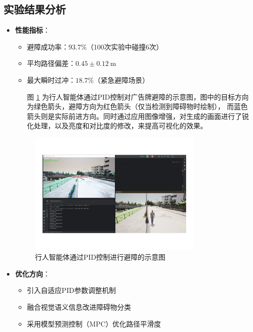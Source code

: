 \subsection{实验结果分析}
\begin{itemize}
    \item \textbf{性能指标}：
    \begin{itemize}
        \item 避障成功率：93.7\%（100次实验中碰撞6次）
        \item 平均路径偏差：$0.45\pm0.12\ \text{m}$
        \item 最大瞬时过冲：$18.7\%$（紧急避障场景）

	图 \ref{fig:pid_obstacle} 为行人智能体通过PID控制对广告牌避障的示意图，图中的目标方向为绿色箭头，避障方向为红色箭头（仅当检测到障碍物时绘制），	而蓝色箭头则是实际前进方向。同时通过应用图像增强，对生成的画面进行了锐化处理，以及亮度和对比度的修改，来提高可视化的效果。

    \end{itemize}

\begin{figure}[H]
    \centering
    \includegraphics[width=0.8\textwidth]{images/obstacle_avoidance.pdf}
    \caption{行人智能体通过PID控制进行避障的示意图}
    \label{fig:pid_obstacle}
\end{figure}
    
    \item \textbf{优化方向}：
    \begin{itemize}
        \item 引入自适应PID参数调整机制
        \item 融合视觉语义信息改进障碍物分类
        \item 采用模型预测控制（MPC）优化路径平滑度
    \end{itemize}
\end{itemize}

